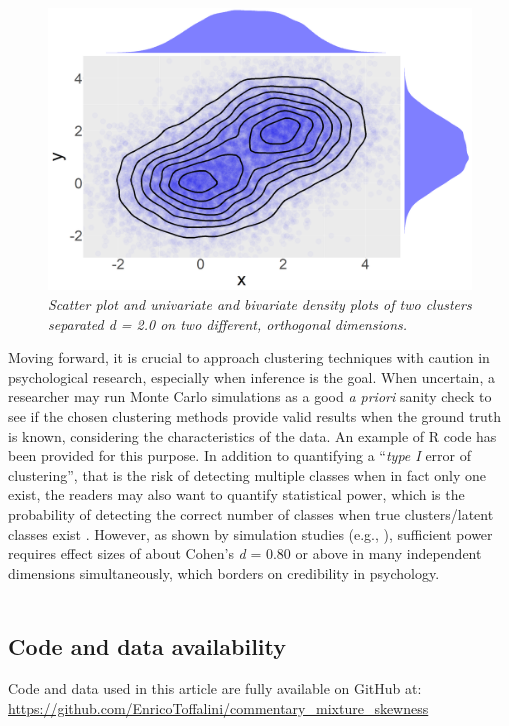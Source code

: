 \documentclass[letterpaper,11pt]{article}
\begin{document}
\begin{figure}[htbp]
	\label{fig:example}
	\caption{\newline \textit{Scatter plot and univariate and bivariate density plots of two clusters separated d = 2.0 on two different, orthogonal dimensions.}}
	\centering
	\includegraphics[width=\textwidth]{../R code simulations/biviariate-scatter-plot.png}
\end{figure}

Moving forward, it is crucial to approach clustering techniques with caution in psychological research, especially when inference is the goal. When uncertain, a researcher may run Monte Carlo simulations as a good \textit{a priori} sanity check to see if the chosen clustering methods provide valid results when the ground truth is known, considering the characteristics of the data. An example of R code has been provided for this purpose. In addition to quantifying a “\textit{type I} error of clustering”, that is the risk of detecting multiple classes when in fact only one exist, the readers may also want to quantify statistical power, which is the probability of detecting the correct number of classes when true clusters/latent classes exist \cite{tein2013statistical}.  However, as shown by simulation studies (e.g., ), sufficient power requires effect sizes of about Cohen’s \textit{d} = 0.80 or above in many independent dimensions simultaneously, which borders on credibility in psychology.
\\
\\
\subsection*{Code and data availability }
Code and data used in this article are fully available on GitHub at: \url{https://github.com/EnricoToffalini/commentary_mixture_skewness}
\newpage


\end{document}
